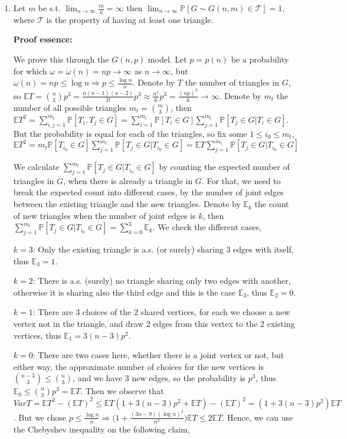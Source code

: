 \documentclass{article}
\begin{document}
\begin{enumerate}
    \item Let $m$ be s.t. $\lim_{n\rightarrow\infty}\frac{m}{n}=\infty$ then $\lim_{n\rightarrow\infty}\mathbb{P}[G\sim{G(n,m)}\in\mathcal{T}]=1$, where $\mathcal{T}$ is the property of having at least one triangle.

    \textbf{Proof essence:}

    We prove this through the $G(n,p)$ model. Let $p=p(n)$ be a probability for which $\omega=\omega(n)=np\rightarrow\infty$ as $n\rightarrow\infty$, but $\omega(n)=np\leq{\log{n}}\Rightarrow{p\leq\frac{\log{n}}{n}}$. Denote by $T$ the number of triangles in $G$, so $\mathbb{E}T=\binom{n}{3}p^3=\frac{n(n-1)(n-2)}{3!}p^3\approx\frac{n^3}{6}p^3=\frac{(np)^3}{6}\rightarrow\infty$. Denote by $m_t$ the number of all possible triangles $m_t=\binom{m}{3}$, then $\mathbb{E}T^2=\sum_{i,j=1}^{m_t}\mathbb{P}[T_i,T_j\in{G}]=\sum_{i=1}^{m_t}\mathbb{P}[T_i\in{G}]\sum_{j=1}^{m_t}\mathbb{P}[T_j\in{G}|T_i\in{G}]$. But the probability is equal for each of the triangles, so fix some $1\leq{i_0}\leq{m_t}$, $\mathbb{E}T^2=m_t\mathbb{P}[T_{i_0}\in{G}]\sum_{j=1}^{m_t}\mathbb{P}[T_j\in{G}|T_{i_0}\in{G}]=\mathbb{E}T\sum_{j=1}^{m_t}\mathbb{P}[T_j\in{G}|T_{i_0}\in{G}]$

We calculate $\sum_{j=1}^{m_t}\mathbb{P}[T_j\in{G}|T_{i_0}\in{G}]$ by counting the expected number of triangles in $G$, when there is already a triangle in $G$. For that, we need to break the expected count into different cases, by the number of joint edges between the existing triangle and the new triangles. Denote by $\mathbb{E}_k$ the count of new triangles when the number of joint edges is $k$, then $\sum_{j=1}^{m_t}\mathbb{P}[T_j\in{G}|T_{i_0}\in{G}]=\sum_{k=0}^3\mathbb{E}_k$.
We check the different cases,

$k=3$: Only the existing triangle is a.s. (or surely) sharing $3$ edges with itself, thus $\mathbb{E}_3=1$.

$k=2$: There is a.s. (surely) no triangle sharing only two edges with another, otherwise it is sharing also the third edge and this is the case $\mathbb{E}_3$, thus $\mathbb{E}_2=0$.

$k=1$: There are $3$ choices of the $2$ shared vertices, for each we choose a new vertex not in the triangle, and draw $2$ edges from this vertex to the $2$ existing vertices, thus $\mathbb{E}_{1}=3(n-3)p^2$.

$k=0$: There are two cases here, whether there is a joint vertex or not, but either way, the approximate number of choices for the new vertices is $\binom{n-3}{3}\leq\binom{n}{3}$, and we have $3$ new edges, so the probability is $p^3$, thus $\mathbb{E}_0\leq\binom{n}{3}p^3=\mathbb{E}T$. Then we observe that $Var{T}=\mathbb{E}T^2-(\mathbb{E}T)^2\leq\mathbb{E}T(1+3(n-3)p^2+\mathbb{E}T)-(\mathbb{E}T)^2=(1+3(n-3)p^2)\mathbb{E}T$. But we chose $p\leq{\frac{\log{n}}{n}}\Rightarrow{(1+\frac{(3n-9)(\log{n})^2}{n^2}})\mathbb{E}T\leq{2\mathbb{E}T}$. Hence, we can use the Chebyshev inequality on the following claim,


\end{enumerate}
\end{document}
